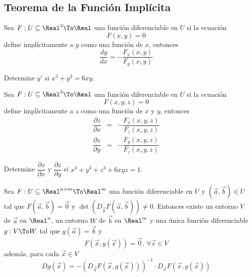 \subsection{Teorema de la Función Implícita}%
\begin{frame}
\subsectionpage
\end{frame}


\begin{frame}
  \begin{thm}
    Sea $F:U\subseteq\Real^2\To\Real$ una función diferenciable en $U$ si la ecuación
    $$F(x,y)=0$$
    define implícitamente a $y$ como una función de $x$, entonces
    $$\dfrac{dy}{dx}=-\dfrac{F_x(x,y)}{F_y(x,y)}$$
  \end{thm}
\end{frame}

\begin{frame}
  \begin{eg}
    Determine $y'$ si $x^3+y^3=6xy$.
  \end{eg}
\end{frame}

\begin{frame}
  \begin{thm}
    Sea $F:U\subseteq\Real^3\To\Real$ una función diferenciable en $U$ si la ecuación
    $$F(x,y,z)=0$$
    define implícitamente a $z$ como una función de $x$ y $y$, entonces
    \begin{eqnarray*}
      \dfrac{\partial z}{\partial x} &=& -\dfrac{F_x(x,y,z)}{F_z(x,y,z)}\\
      \dfrac{\partial z}{\partial y} &=& -\dfrac{F_y(x,y,z)}{F_z(x,y,z)}
    \end{eqnarray*}
  \end{thm}
\end{frame}

\begin{frame}
  \begin{eg}
    Determine $\dfrac{\partial z}{\partial x}$ y $\dfrac{\partial z}{\partial y}$ si $x^3+y^3+z^3+6xyz=1$.
  \end{eg}
\end{frame}

\begin{frame}
  \begin{thm}
    Sea $F:U\subseteq\Real^{n+m}\To\Real^m$ una función diferenciable en $U$ y $(\vec{a},\vec{b})\in U$ tal que $F(\vec{a},\vec{b})=\vec{0}$ y $\det(D_{\vec{y}}F(\vec{a},\vec{b}))\neq0$. Entonces existe un entorno $V$ de $\vec{a}$ en $\Real^n$, un entorno $W$ de $\vec{b}$ en $\Real^m$ y una única función diferenciable $g:V\To W$ tal que $g(\vec{a})=\vec{b}$ y
    $$F(\vec{x},g(\vec{x}))=\vec{0},\ \forall \vec{x}\in V$$
    además, para cada $\vec{x}\in V$
    $$Dg(\vec{x})=-\left(D_{\vec{y}}F(\vec{x},g(\vec{x}))\right)^{-1}\cdot D_{\vec{x}}F(\vec{x},g(\vec{x}))$$
  \end{thm}
\end{frame}

